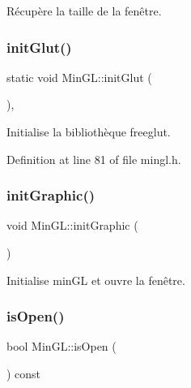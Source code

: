 Récupère la taille de la fenêtre. 

\mbox{\label{class_min_g_l_a17c7718b9e966c8147cd56483dcf4e8d}} 
\subsubsection{\texorpdfstring{init\+Glut()}{initGlut()}}
{\footnotesize\ttfamily static void Min\+G\+L\+::init\+Glut (\begin{DoxyParamCaption}{ }\end{DoxyParamCaption})\hspace{0.3cm}{\ttfamily [inline]}, {\ttfamily [static]}}



Initialise la bibliothèque freeglut. 



Definition at line 81 of file mingl.\+h.

\mbox{\label{class_min_g_l_a5962a0a0ced7879bc0cc65e267e8d7fc}} 
\subsubsection{\texorpdfstring{init\+Graphic()}{initGraphic()}}
{\footnotesize\ttfamily void Min\+G\+L\+::init\+Graphic (\begin{DoxyParamCaption}{ }\end{DoxyParamCaption})}



Initialise min\+GL et ouvre la fenêtre. 

\mbox{\label{class_min_g_l_a05a0da9d0729e9c7dbd1121b0956866d}} 
\subsubsection{\texorpdfstring{is\+Open()}{isOpen()}}
{\footnotesize\ttfamily bool Min\+G\+L\+::is\+Open (\begin{DoxyParamCaption}{ }\end{DoxyParamCaption}) const}



